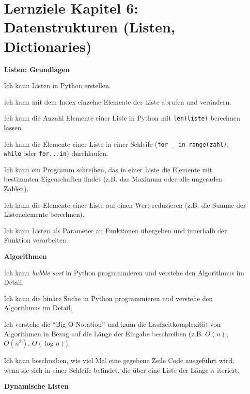 \section*{Lernziele Kapitel 6: Datenstrukturen (Listen, Dictionaries)}


\begin{todolist}
    \item \textbf{Listen: Grundlagen}
    \begin{todolist}
        \item Ich kann Listen in Python erstellen.
        \item Ich kann mit dem Index einzelne Elemente der Liste abrufen und verändern.
        \item Ich kann die Anzahl Elemente einer Liste in Python mit \lstinline|len(liste)| berechnen lassen.
        \item Ich kann die Elemente einer Liste in einer Schleife (\lstinline|for _ in range(zahl)|, \lstinline|while| oder \lstinline|for...in|) durchlaufen.
        \item Ich kann ein Programm schreiben, das in einer Liste die Elemente mit bestimmten Eigenschaften findet (z.B. das Maximum oder alle ungeraden Zahlen).
        \item Ich kann die Elemente einer Liste auf einen Wert reduzieren (z.B. die Summe der Listenelemente berechnen).
        \item Ich kann Listen als Parameter an Funktionen übergeben und innerhalb der Funktion verarbeiten.
    \end{todolist}
    \item \textbf{Algorithmen}
    \begin{todolist}
        \item Ich kann \textit{bubble sort} in Python programmieren und verstehe den Algorithmus im Detail.
        \item Ich kann die binäre Suche in Python programmieren und verstehe den Algorithmus im Detail.
        \item Ich verstehe die \enquote{Big-O-Notation} und kann die Laufzeitkomplexität von Algorithmen in Bezug auf die Länge der Eingabe beschreiben (z.B. $O(n)$, $O(n^2)$, $O(\log n)$).
        \item Ich kann beschreiben, wie viel Mal eine gegebene Zeile Code ausgeführt wird, wenn sie sich in einer Schleife befindet, die über eine Liste der Länge $n$ iteriert.
    \end{todolist}
    \item \textbf{Dynamische Listen}

\end{todolist}
